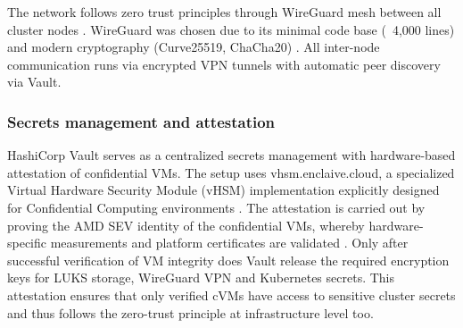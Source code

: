 The network follows zero trust principles through WireGuard mesh between all cluster nodes \parencite{nist_zero_trust_2020}. WireGuard was chosen due to its minimal code base (~4,000 lines) and modern cryptography (Curve25519, ChaCha20) \parencite{donenfeld_wireguard_2017, wireguard_protocol_2024}. All inter-node communication runs via encrypted VPN tunnels with automatic peer discovery via Vault.

\subsubsection{Secrets management and attestation}

HashiCorp Vault serves as a centralized secrets management with hardware-based attestation of confidential VMs. The setup uses vhsm.enclaive.cloud, a specialized Virtual Hardware Security Module (vHSM) implementation explicitly designed for Confidential Computing environments \parencite{enclaive_vhsm_2025}.
The attestation is carried out by proving the AMD SEV identity of the confidential VMs, whereby hardware-specific measurements and platform certificates are validated \parencite{kaplan_amd_encryption_2016, confidential_computing_consortium_2024}. Only after successful verification of VM integrity does Vault release the required encryption keys for LUKS storage, WireGuard VPN and Kubernetes secrets. This attestation ensures that only verified cVMs have access to sensitive cluster secrets and thus follows the zero-trust principle at infrastructure level too.

